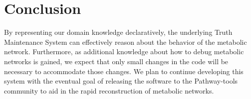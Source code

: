 \section{Conclusion}

By representing our domain knowledge declaratively, the underlying
Truth Maintenance System can effectively reason about the behavior of
the metabolic network.  Furthermore, as additional knowledge about how
to debug metabolic networks is gained, we expect that only small
changes in the code will be necessary to accommodate those changes.
We plan to continue developing this system with the eventual goal of
releasing the software to the Pathway-tools community to aid in the
rapid reconstruction of metabolic networks.

